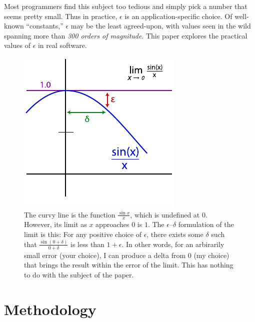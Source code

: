 \documentclass[twocolumn]{article}
\begin{document}
Most programmers find this subject too tedious and simply pick a
number that seems pretty small. Thus in practice, $\epsilon$ is an
application-specific choice. Of well-known ``constants,'' $\epsilon$
may be the least agreed-upon, with values seen in the wild spanning
more than {\em 300 orders of magnitude}. This paper explores the
practical values of $\epsilon$ in real software.

\begin{figure}[ht]
\begin{center}
\includegraphics[width=0.90 \linewidth]{epsilondelta.pdf}
\end{center}\vspace{-0.1in}
\caption{ The curvy line is the function $\frac{\sin x}{x}$, which is
  undefined at $0$. However, its limit as $x$ approaches $0$ is $1$.
  The $\epsilon$--$\delta$ formulation of the limit is this: For any
  positive choice of $\epsilon$, there exists some $\delta$ such that
  $\frac{\sin (0 + \delta)}{0 + \delta}$ is less than $1 + \epsilon$.
  In other words, for an arbirarily small error (your choice), I
  can produce a delta from $0$ (my choice) that brings the result
  within the error of the limit. This has nothing to do with the
  subject of the paper.}
\label{fig:epsilondelta}
\end{figure}

\section{Methodology}
\end{document}
